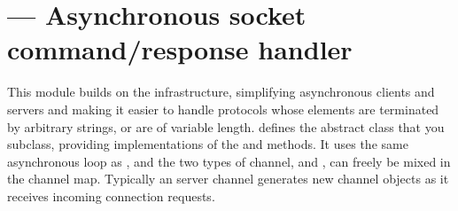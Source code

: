 \section{ ---
         Asynchronous socket command/response handler}


This module builds on the  infrastructure,
simplifying asynchronous clients and servers and making it easier to
handle protocols whose elements are terminated by arbitrary strings, or
are of variable length.  defines the abstract class
 that you subclass, providing implementations of the
 and 
methods. It uses the same asynchronous loop as , and
the two types of channel,  and
, can freely be mixed in the channel map.
Typically an  server channel generates new
 channel objects as it receives incoming
connection requests. 

